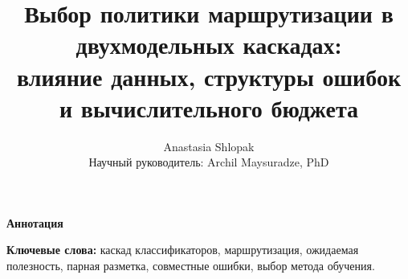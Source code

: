 \documentclass{article}
\title{Выбор политики маршрутизации в двухмодельных каскадах:\\
влияние данных, структуры ошибок и вычислительного бюджета}
\author{Anastasia Shlopak\\Научный руководитель: Archil Maysuradze, PhD}
\renewenvironment{abstract}{\begin{center}\bfseries Аннотация\end{center}\begin{quote}\small}{\end{quote}}
\begin{document}
\maketitle
\begin{abstract}

\end{abstract}
\noindent\textbf{Ключевые слова:} каскад классификаторов, маршрутизация,
ожидаемая полезность, парная разметка, совместные ошибки, выбор метода обучения.










\clearpage
\appendix

\end{document}
